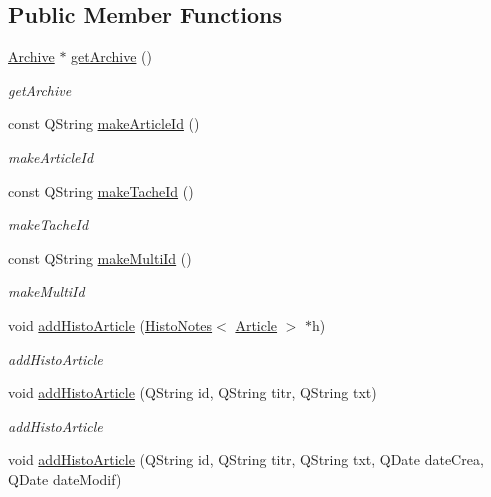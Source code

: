 \subsection*{Public Member Functions}
\begin{DoxyCompactItemize}
\item 
\hyperlink{class_archive}{Archive} $\ast$ \hyperlink{class_histo_note_manager_a20b1ac0b28a181af8320d311f6284743}{get\+Archive} ()
\begin{DoxyCompactList}\small\item\em get\+Archive \end{DoxyCompactList}\item 
const Q\+String \hyperlink{class_histo_note_manager_a53f594ce147e634b25047f483704d17f}{make\+Article\+Id} ()
\begin{DoxyCompactList}\small\item\em make\+Article\+Id \end{DoxyCompactList}\item 
const Q\+String \hyperlink{class_histo_note_manager_aa78e22da815d3fb4c427946c00c7e03a}{make\+Tache\+Id} ()
\begin{DoxyCompactList}\small\item\em make\+Tache\+Id \end{DoxyCompactList}\item 
const Q\+String \hyperlink{class_histo_note_manager_ac38463596cf0013c74646a7d9cc3d177}{make\+Multi\+Id} ()
\begin{DoxyCompactList}\small\item\em make\+Multi\+Id \end{DoxyCompactList}\item 
void \hyperlink{class_histo_note_manager_a8d02ddc1a22a9c1fd8d472dfd0ba321e}{add\+Histo\+Article} (\hyperlink{class_histo_notes}{Histo\+Notes}$<$ \hyperlink{class_article}{Article} $>$ $\ast$h)
\begin{DoxyCompactList}\small\item\em add\+Histo\+Article \end{DoxyCompactList}\item 
void \hyperlink{class_histo_note_manager_ac66cb7fa79ceeffc942077077714daab}{add\+Histo\+Article} (Q\+String id, Q\+String titr, Q\+String txt)
\begin{DoxyCompactList}\small\item\em add\+Histo\+Article \end{DoxyCompactList}\item 
void \hyperlink{class_histo_note_manager_ad5ecabf4a64aaf63ab79770d32073306}{add\+Histo\+Article} (Q\+String id, Q\+String titr, Q\+String txt, Q\+Date date\+Crea, Q\+Date date\+Modif)

\end{DoxyCompactItemize}
